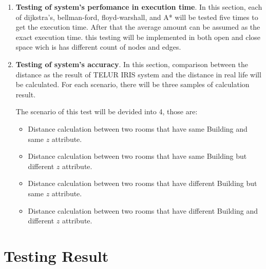 \begin{enumerate}
	\item \textbf{Testing of system's perfomance in execution time}. In this section, each of dijkstra's, bellman-ford, floyd-warshall, and A* will be tested five times to get the execution time. After that the average amount can be assumed as the exact execution time. this testing will be implemented in both open and close space wich is has different count of nodes and edges.
	
	\item \textbf{Testing of system's accuracy}. In this section, comparison between the distance as the result of TELUR IRIS system and  the distance in real life will be calculated. For each scenario, there will be three samples of calculation result.
	
	The scenario of this test will be devided into 4, those are:
	\begin{itemize}
		\item Distance calculation between two rooms that have same Building and same $z$ attribute.
		\item Distance calculation between two rooms that have same Building but different $z$ attribute.
		\item Distance calculation between two rooms that have different Building but same $z$ attribute.
		\item Distance calculation between two rooms that have different Building and different $z$ attribute.
	\end{itemize}
	
\end{enumerate}

\section{Testing Result}

